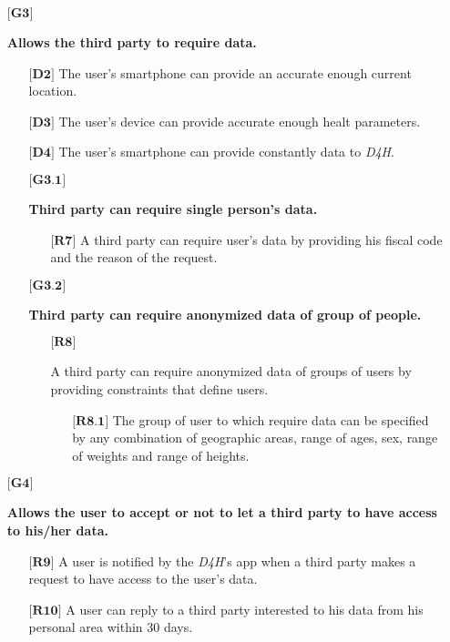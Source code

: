 \begin{itemize}
	\item[${\textbf{[G3]}}$] {\textbf{Allows the third party to require data.}
		\begin{itemize}
			\item[$\textbf{[D2]}$] {The user's smartphone can provide an accurate enough current location.}
			\item[$\textbf{[D3]}$] {The user's device can provide accurate enough healt parameters.}
			\item[$\textbf{[D4]}$] {The user's smartphone can provide constantly data to \hbox{\emph{D4H}}.}
			\item[${\textbf{[G3.1]}}$] {\textbf{Third party can require single person's data.}
				\begin{itemize}
					\item[$\textbf{[R7]}$] {A third party can require user's data by providing his fiscal code and the reason of the request.}
				\end{itemize}}
			\item[${\textbf{[G3.2]}}$] {\textbf{Third party can require anonymized data of group of people.}
				\begin{itemize}
					\item[$\textbf{[R8]}$] {A third party can require anonymized data of groups of users by providing constraints that define users.
						\begin{itemize}
							\item[$\textbf{[R8.1]}$] {The group of user to which require data can be specified by any combination of geographic areas, range of ages, 									sex, range of weights and range of heights.}
						\end{itemize}}
				\end{itemize}}
		\end{itemize}}


	\item[${\textbf{[G4]}}$] {\textbf{Allows the user to accept or not to let a third party to have access to his/her data.}
		\begin{itemize}	
			\item[$\textbf{[R9]}$] {A user is notified by the \hbox{\emph{D4H}}'s app when a third party makes a request to have access to the user's data.}
			\item[$\textbf{[R10]}$] {A user can reply to a third party interested to his data from his personal area within 30 days.}
		\end{itemize}}



\end{itemize}
